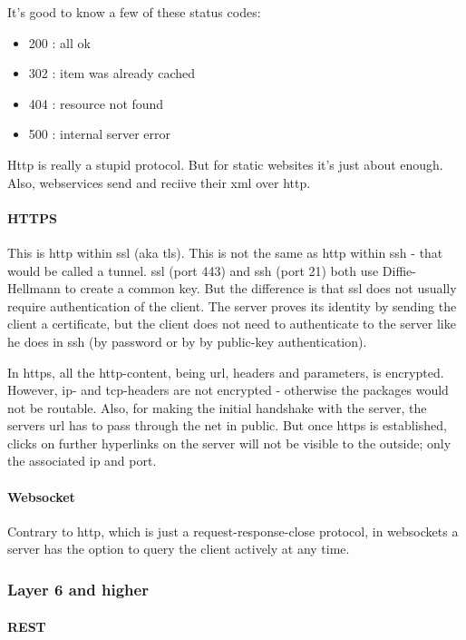It's good to know a few of these status codes: 
\begin{itemize}
    \item 200 : all ok
    \item 302 : item was already cached
    \item 404 : resource not found
    \item 500 : internal server error
\end{itemize}

Http is really a stupid protocol. But for static websites it's just about enough. Also, webservices send and reciive their xml over http.

\paragraph{HTTPS} 

This is http within ssl (aka tls). This is not the same as http within ssh - that would be called a tunnel. ssl (port 443) and ssh (port 21) both use Diffie-Hellmann to create a common key. But the difference is that ssl does not usually require authentication of the client. The server proves its identity by sending the client a certificate, but the client does not need to authenticate to the server like he does in ssh (by password or by by public-key authentication).

In https, all the http-content, being url, headers and parameters, is encrypted. However, ip- and tcp-headers are not encrypted - otherwise the packages would not be routable. Also, for making the initial handshake with the server, the servers url has to pass through the net in public. But once https is established, clicks on further hyperlinks on the server will not be visible to the outside; only the associated ip and port.

\paragraph{Websocket}
Contrary to http, which is just a request-response-close protocol, in websockets a server has the option to query the client actively at any time. 


\subsubsection{Layer 6 and higher}

\paragraph{REST} 

